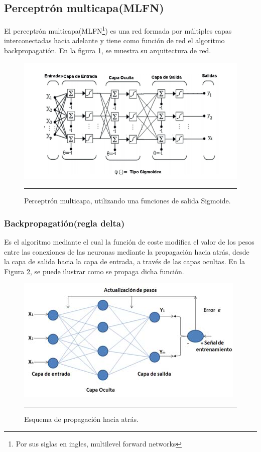 \documentclass[11pt,titlepage]{report}
\begin{document}
\subsection{Perceptrón multicapa(MLFN)}
El perceptrón multicapa(MLFN\footnote{Por sus siglas en ingles, multilevel forward networks}) es una red formada por múltiples capas interconectadas hacia adelante y tiene como función de red el algoritmo backpropagatión. En la figura \ref{04}, se muestra su arquitectura de red.
\begin{figure}[h]
	\centering
\includegraphics[scale=0.78]{Pic/red03}
\caption{Perceptrón multicapa, utilizando una funciones de salida Sigmoide. \cite{Lib04}\\}
\label{04}
\hrule
\end{figure}
\newpage
\subsubsection{Backpropagatión(regla delta)}
Es el algoritmo mediante el cual la función de coste modifica el valor de los pesos entre las conexiones de las neuronas mediante la propagación hacia atrás, desde la capa de salida hacia la capa de entrada, a través de las capas ocultas. En la Figura \ref{02}, se puede ilustrar como se propaga dicha función.\\
\begin{figure}[h]
\centering
\includegraphics[scale=0.7]{Pic/Backpropagation}
\caption{Esquema de propagación hacia atrás.\cite{Int10}}
\label{02}
\hrule
\end{figure}
\end{document}

